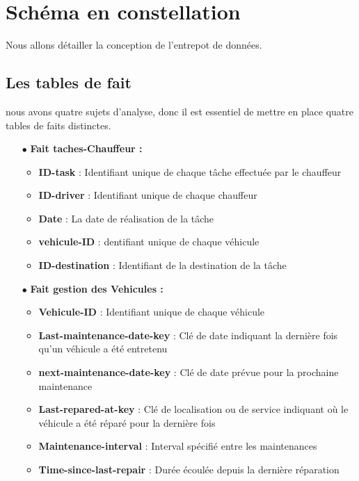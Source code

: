 \section{Schéma en constellation}
Nous allons détailler la conception de l’entrepot de données.

\subsection{Les tables de fait}
nous avons quatre sujets d’analyse, donc il est essentiel de mettre en place quatre tables de
faits distinctes.
\begin{itemize}
    \bigskip
    \item[$\bullet$] \large\textbf{Fait taches-Chauffeur :}
          \begin{itemize}[leftmargin=2em]
              \item \textbf{ID-task} : Identifiant unique de chaque tâche effectuée par le chauffeur
              \item \textbf{ID-driver} : Identifiant unique de chaque chauffeur
              \item \textbf{Date} :  La date de réalisation de la tâche
              \item \textbf{vehicule-ID} : dentifiant unique de chaque véhicule
              \item \textbf{ID-destination} :  Identifiant de la destination de la tâche

          \end{itemize}
\end{itemize}

\bigskip

\begin{itemize}
    \item[$\bullet$] \large\textbf{ Fait gestion des Vehicules :}
          \begin{itemize}[leftmargin=2em]
              \item \textbf{Vehicule-ID} :  Identifiant unique de chaque véhicule
              \item \textbf{Last-maintenance-date-key} : Clé de date indiquant la dernière fois qu'un véhicule a été entretenu
              \item \textbf{next-maintenance-date-key} : Clé de date prévue pour la prochaine maintenance
              \item \textbf{Last-repared-at-key} : Clé de localisation ou de service indiquant où le véhicule a été réparé pour la dernière fois
              \item \textbf{Maintenance-interval} : Interval spécifié entre les maintenances
              \item \textbf{Time-since-last-repair} : Durée écoulée depuis la dernière réparation
          \end{itemize}
\end{itemize}
\newpage

